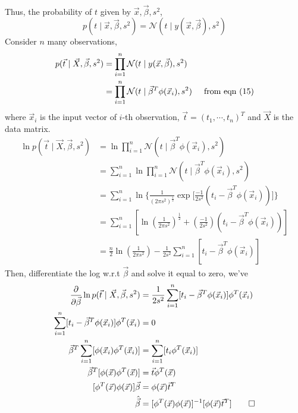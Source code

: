 \documentclass{article}
\begin{document}
\paragraph{}
Thus, the probability of $t$ given by $\Vec{x}, \Vec{\beta}, s^2$, 
\begin{equation*}
    p(t \mid \Vec{x}, \Vec{\beta}, s^2) = 
    \mathcal{N}(t \mid y(\Vec{x},\Vec{\beta}), s^2)
\end{equation*}
Consider $n$ many observations,
\begin{align}
    p(\Vec{t} \mid \Vec{X}, \Vec{\beta}, s^2) &=
    \prod_{i=1}^{n}\mathcal{N}(t \mid y(\Vec{x},\Vec{\beta}), s^2) \nonumber \\
    &= \prod_{i=1}^{n}\mathcal{N}(t \mid \Vec{\beta}^{T}\phi(\Vec{x}_i), s^2) \hspace{5mm} \text{from eqn (15)}
\end{align}
where  $\Vec{x}_i$ is the input vector of $i$-th observation,
$\Vec{t} = (t_1, \cdots,t_n)^{T}$ and $\Vec{X}$ is the data matrix.   
\begin{align*}
    \ln{p(\Vec{t} \mid \Vec{X}, \Vec{\beta}, s^2)} &=
    \ln{\prod_{i=1}^{n}\mathcal{N}(t \mid \Vec{\beta}^{T}\phi(\Vec{x}_i), s^2)} \\
    &= \displaystyle\sum_{i=1}^{n} \ln{\prod_{i=1}^{n}\mathcal{N}(t \mid \Vec{\beta}^{T}\phi(\Vec{x}_i), s^2)} \\
    &= \displaystyle\sum_{i=1}^{n}
    \ln{ \{ \frac{1}{(2\pi s^2)^\frac{1}{2}}\exp{[\frac{-1}{2s^2}(t_i - \Vec{\beta}^{T}\phi(\Vec{x}_i))}]\}} \\
    &= \displaystyle\sum_{i=1}^{n}
    [\ln(\frac{1}{2\pi s^2})^\frac{1}{2}+(\frac{-1}{2s^2})
    (t_i - \Vec{\beta}^{T}\phi(\Vec{x}_i))] \\
    &= \frac{n}{2}\ln(\frac{1}{2\pi s^2}) - \frac{1}{2s^2}
    \displaystyle\sum_{i=1}^{n}[t_i - \Vec{\beta}^{T}\phi(\Vec{x}_i)] 
\end{align*}
Then, differentiate the log w.r.t $\Vec{\beta}$ and solve it equal to zero, we've 
\begin{align}
    \frac{\partial}{\partial\Vec{\beta}}\ln{p(\Vec{t} \mid \Vec{X}, \Vec{\beta}, s^2)} &= \frac{1}{2s^2}\displaystyle\sum_{i=1}^{n}[t_i - \Vec{\beta}^{T}\phi(\Vec{x}_i)]\phi^{T}(\Vec{x}_i) \nonumber \\
    \displaystyle\sum_{i=1}^{n}[t_i - \Vec{\beta}^{T}\phi(\Vec{x}_i)]\phi^{T}(\Vec{x}_i) &= 0 \nonumber \\
    \Vec{\beta}^{T}\displaystyle\sum_{i=1}^{n}[\phi(\Vec{x}_i)\phi^{T}(\Vec{x}_i)] &= \displaystyle\sum_{i=1}^{n}[t_i\phi^{T}(\Vec{x}_i)] \nonumber \\
    \Vec{\beta}^{T}[\phi(\Vec{x})\phi^{T}(\Vec{x})] &= \Vec{t}\phi^{T}(\Vec{x}) \nonumber \\
    [\phi^{T}(\Vec{x})\phi(\Vec{x})] \Vec{\beta} &= \phi(\Vec{x})\Vec{t}^{T} \nonumber \\
    \hat{\Vec{\beta}} &= [\phi^{T}(\Vec{x})\phi(\Vec{x})]^{-1}[\phi(\Vec{x})\Vec{t}^{T}]
    \qed
\end{align}
\end{document}
